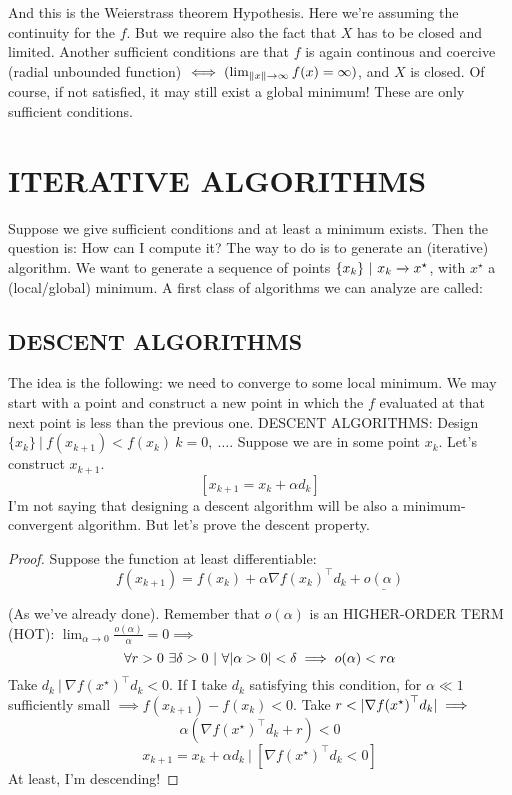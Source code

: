 And this is the Weierstrass theorem Hypothesis. Here we're assuming the continuity for the $f$. But we require also the fact that $X$ has to be closed and limited. Another sufficient conditions are that $f$ is again continous and coercive (radial unbounded function) $\iff (\lim_{\lVert x\rVert\to\infty}{f(x)} = \infty)$, and $X$ is closed. Of course, if not satisfied, it may still exist a global minimum! These are only sufficient conditions.

\section{ITERATIVE ALGORITHMS}

Suppose we give sufficient conditions and at least a minimum exists. Then the question is: How can I compute it? The way to do is to generate an (iterative) algorithm. We want to generate a sequence of points $\{x_k\}\ |\ x_k \tendsto{} x^\star$, with $x^\star$ a (local/global) minimum. A first class of algorithms we can analyze are called:

\subsection{DESCENT ALGORITHMS}

The idea is the following: we need to converge to some local minimum. We may start with a point and construct a new point in which the $f$ evaluated at that next point is less than the previous one. DESCENT ALGORITHMS: Design $\{x_k\}\ |\ f(x_{k+1}) < f(x_k)\ k=0,\ \dots$. Suppose we are in some point $x_k$. Let's construct $x_{k+1}$.
\[
	[x_{k+1} = x_k + \alpha d_k]
\]
I'm not saying that designing a descent algorithm will be also a minimum-convergent algorithm. But let's prove the descent property.

\begin{proof}
Suppose the function at least differentiable:
\[
	f(x_{k+1}) = f(x_k) + \alpha\nabla{f(x_k)}^\top d_k + \underline{o(\alpha)}
\]

(As we've already done). Remember that $o(\alpha)$ is an HIGHER-ORDER TERM (HOT): $\lim_{\alpha\to 0}{\frac{o(\alpha)}{\alpha}} = 0 \implies$
\[
	\forall r > 0\ \exists \delta > 0\ |\ \forall\abs{\alpha > 0} < \delta \implies o(\alpha)<r\alpha
\]
Take $d_k\ |\ \nabla{f(x^\star)}^\top d_k < 0$. If I take $d_k$ satisfying this condition, for $\alpha \ll 1$ sufficiently small $\implies f(x_{k+1})-f(x_k)<0$.
Take $r < \lvert\nabla{f(x^\star)}^\top d_k\rvert \implies$
\[
	\alpha(\nabla{f(x^\star)}^\top d_k + r) < 0	
\]
\[
	x_{k+1} = x_k + \alpha d_k\ |\ [\nabla{f(x^\star)}^\top d_k < 0]
\]
At least, I'm descending!
\end{proof}

